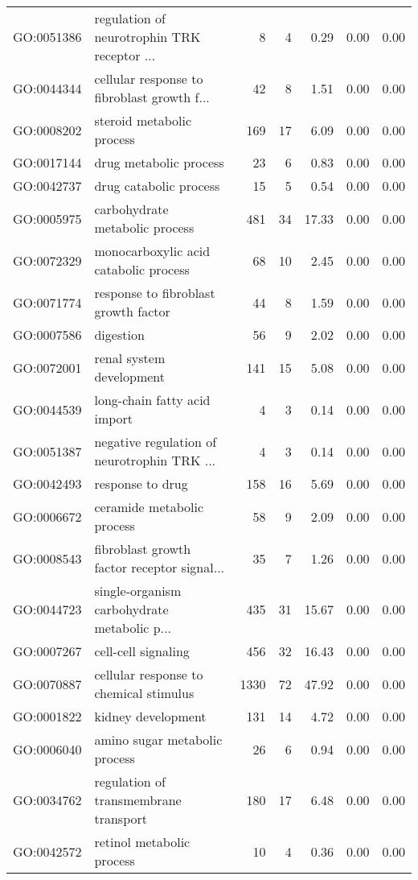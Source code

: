 \begin{table}[ht]
\begin{tabular}{llrrrrr}
  GO:0051386 & regulation of neurotrophin TRK receptor ... &   8 &   4 & 0.29 & 0.00 & 0.00 \\ 
  GO:0044344 & cellular response to fibroblast growth f... &  42 &   8 & 1.51 & 0.00 & 0.00 \\ 
  GO:0008202 & steroid metabolic process & 169 &  17 & 6.09 & 0.00 & 0.00 \\ 
  GO:0017144 & drug metabolic process &  23 &   6 & 0.83 & 0.00 & 0.00 \\ 
  GO:0042737 & drug catabolic process &  15 &   5 & 0.54 & 0.00 & 0.00 \\ 
  GO:0005975 & carbohydrate metabolic process & 481 &  34 & 17.33 & 0.00 & 0.00 \\ 
  GO:0072329 & monocarboxylic acid catabolic process &  68 &  10 & 2.45 & 0.00 & 0.00 \\ 
  GO:0071774 & response to fibroblast growth factor &  44 &   8 & 1.59 & 0.00 & 0.00 \\ 
  GO:0007586 & digestion &  56 &   9 & 2.02 & 0.00 & 0.00 \\ 
  GO:0072001 & renal system development & 141 &  15 & 5.08 & 0.00 & 0.00 \\ 
  GO:0044539 & long-chain fatty acid import &   4 &   3 & 0.14 & 0.00 & 0.00 \\ 
  GO:0051387 & negative regulation of neurotrophin TRK ... &   4 &   3 & 0.14 & 0.00 & 0.00 \\ 
  GO:0042493 & response to drug & 158 &  16 & 5.69 & 0.00 & 0.00 \\ 
  GO:0006672 & ceramide metabolic process &  58 &   9 & 2.09 & 0.00 & 0.00 \\ 
  GO:0008543 & fibroblast growth factor receptor signal... &  35 &   7 & 1.26 & 0.00 & 0.00 \\ 
  GO:0044723 & single-organism carbohydrate metabolic p... & 435 &  31 & 15.67 & 0.00 & 0.00 \\ 
  GO:0007267 & cell-cell signaling & 456 &  32 & 16.43 & 0.00 & 0.00 \\ 
  GO:0070887 & cellular response to chemical stimulus & 1330 &  72 & 47.92 & 0.00 & 0.00 \\ 
  GO:0001822 & kidney development & 131 &  14 & 4.72 & 0.00 & 0.00 \\ 
  GO:0006040 & amino sugar metabolic process &  26 &   6 & 0.94 & 0.00 & 0.00 \\ 
  GO:0034762 & regulation of transmembrane transport & 180 &  17 & 6.48 & 0.00 & 0.00 \\ 
  GO:0042572 & retinol metabolic process &  10 &   4 & 0.36 & 0.00 & 0.00 \\ 

\end{tabular}
\end{table}
